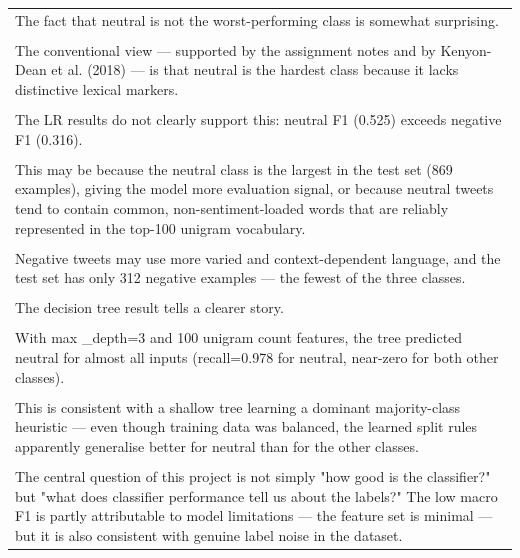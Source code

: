 \documentclass[11pt]{article}
\begin{document}
\begin{longtable}{|p{\dimexpr\linewidth-2\tabcolsep-2\arrayrulewidth\relax}|}
\hline
\rule{0pt}{3.5cm} \\
\hline
The fact that neutral is not the worst-performing class is somewhat surprising. \\[2pt]
\hline
\rule{0pt}{3.5cm} \\
\hline
The conventional view --- supported by the assignment notes and by Kenyon-Dean et al. (2018) --- is that neutral is the hardest class because it lacks distinctive lexical markers. \\[2pt]
\hline
\rule{0pt}{3.5cm} \\
\hline
The LR results do not clearly support this: neutral F1 (0.525) exceeds negative F1 (0.316). \\[2pt]
\hline
\rule{0pt}{3.5cm} \\
\hline
This may be because the neutral class is the largest in the test set (869 examples), giving the model more evaluation signal, or because neutral tweets tend to contain common, non-sentiment-loaded words that are reliably represented in the top-100 unigram vocabulary. \\[2pt]
\hline
\rule{0pt}{3.5cm} \\
\hline
Negative tweets may use more varied and context-dependent language, and the test set has only 312 negative examples --- the fewest of the three classes. \\[2pt]
\hline
\rule{0pt}{3.5cm} \\
\hline
The decision tree result tells a clearer story. \\[2pt]
\hline
\rule{0pt}{3.5cm} \\
\hline
With max \_depth=3 and 100 unigram count features, the tree predicted neutral for almost all inputs (recall=0.978 for neutral, near-zero for both other classes). \\[2pt]
\hline
\rule{0pt}{3.5cm} \\
\hline
This is consistent with a shallow tree learning a dominant majority-class heuristic --- even though training data was balanced, the learned split rules apparently generalise better for neutral than for the other classes. \\[2pt]
\hline
\rule{0pt}{3.5cm} \\
\hline
The central question of this project is not simply "how good is the classifier?" but "what does classifier performance tell us about the labels?" The low macro F1 is partly attributable to model limitations --- the feature set is minimal --- but it is also consistent with genuine label noise in the dataset. \\[2pt]

\end{longtable}
\end{document}
